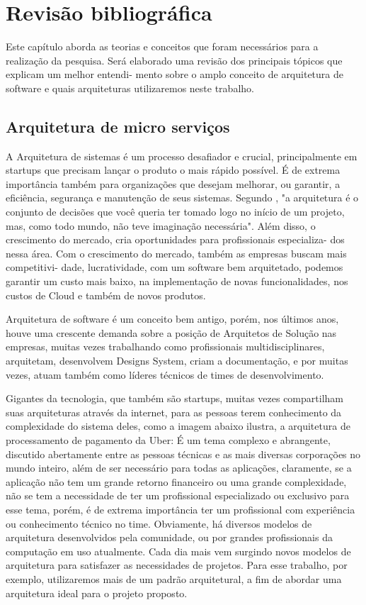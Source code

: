 \chapter{Revisão bibliográfica}
Este capítulo aborda as teorias e conceitos que foram necessários para a realização da
pesquisa. Será elaborado uma revisão dos principais tópicos que explicam um melhor entendi-
mento sobre o amplo conceito de arquitetura de software e quais arquiteturas utilizaremos neste
trabalho.


\section{Arquitetura de micro serviços}
A Arquitetura de sistemas é um processo desafiador e crucial, principalmente em startups
que precisam lançar o produto o mais rápido possível. É de extrema importância também para
organizações que desejam melhorar, ou garantir, a eficiência, segurança e manutenção de seus
sistemas. Segundo \cite{Martin2017}, "a arquitetura é o conjunto de decisões que você queria ter
tomado logo no início de um projeto, mas, como todo mundo, não teve imaginação necessária".
Além disso, o crescimento do mercado, cria oportunidades para profissionais especializa-
dos nessa área. Com o crescimento do mercado, também as empresas buscam mais competitivi-
dade, lucratividade, com um software bem arquitetado, podemos garantir um custo mais baixo,
na implementação de novas funcionalidades, nos custos de Cloud e também de novos produtos.

Arquitetura de software é um conceito bem antigo, porém, nos últimos anos, houve
uma crescente demanda sobre a posição de Arquitetos de Solução nas empresas, muitas vezes
trabalhando como profissionais multidisciplinares, arquitetam, desenvolvem Designs System,
criam a documentação, e por muitas vezes, atuam também como líderes técnicos de times de
desenvolvimento.

Gigantes da tecnologia, que também são startups, muitas vezes compartilham suas
arquiteturas através da internet, para as pessoas terem conhecimento da complexidade do sistema
deles, como a imagem abaixo ilustra, a arquitetura de processamento de pagamento da Uber:
É um tema complexo e abrangente, discutido abertamente entre as pessoas técnicas e as
mais diversas corporações no mundo inteiro, além de ser necessário para todas as aplicações,
claramente, se a aplicação não tem um grande retorno financeiro ou uma grande complexidade,
não se tem a necessidade de ter um profissional especializado ou exclusivo para esse tema, porém,
é de extrema importância ter um profissional com experiência ou conhecimento técnico no time.
Obviamente, há diversos modelos de arquitetura desenvolvidos pela comunidade, ou
por grandes profissionais da computação em uso atualmente. Cada dia mais vem surgindo
novos modelos de arquitetura para satisfazer as necessidades de projetos. Para esse trabalho, por
exemplo, utilizaremos mais de um padrão arquitetural, a fim de abordar uma arquitetura ideal
para o projeto proposto.

